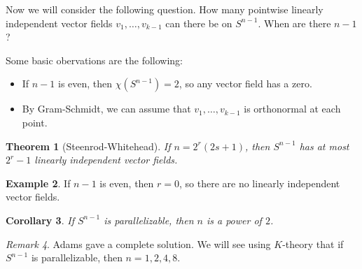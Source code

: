\documentclass[leqno, openany]{memoir}
\newtheorem{thm}{Theorem}[section]
\newtheorem{cor}[thm]{Corollary}
\theoremstyle{definition}
\newtheorem{exm}[thm]{Example}
\theoremstyle{remark}
\newtheorem{rmk}[thm]{Remark}
\theoremstyle{plain}
\theoremstyle{definition}
\theoremstyle{remark}
\begin{document}
Now we will consider the following question. How many pointwise linearly
independent vector fields $v_1, \ldots, v_{k-1}$ can there be on $S^{n-1}$.
When are there $n-1$?

Some basic obervations are the following: \begin{itemize} \item If $n-1$ is
even, then $\chi(S^{n-1}) = 2$, so any vector field has a zero.  \item By
Gram-Schmidt, we can assume that $v_1, \ldots, v_{k-1}$ is orthonormal at each
point.  \end{itemize}

\begin{thm}[Steenrod-Whitehead] If $n = 2^r (2s+1)$, then $S^{n-1}$ has at most
$2^{r}-1$ linearly independent vector fields.  \end{thm}

\begin{exm} If $n-1$ is even, then $r=0$, so there are no linearly independent
vector fields.  \end{exm}

\begin{cor} If $S^{n-1}$ is parallelizable, then $n$ is a power of $2$.
\end{cor}

\begin{rmk} Adams gave a complete solution. We will see using $K$-theory that
if $S^{n-1}$ is parallelizable, then $n = 1,2,4,8$.  \end{rmk}
\end{document}

